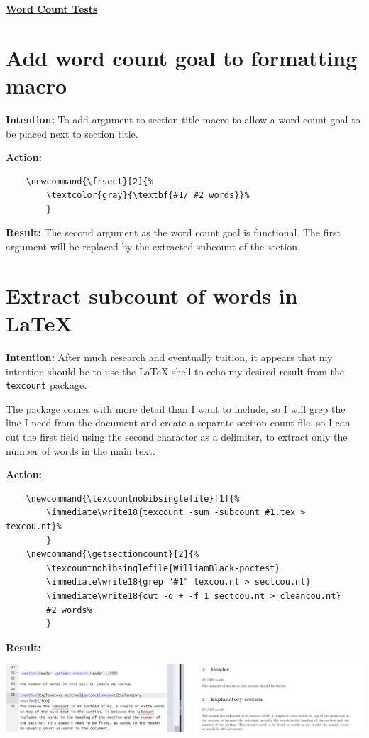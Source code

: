 \documentclass[12pt]{article}
\begin{document}
\newpage

\underline{\textbf{\Large{Word Count Tests}}}
\section{\large Add word count goal to formatting macro}

\textbf{Intention:} To add argument to section title macro to allow a word count goal to be placed next to section title.

\textbf{Action:} \begin{verbatim}
    \newcommand{\frsect}[2]{%
        \textcolor{gray}{\textbf{#1/ #2 words}}%
        }
\end{verbatim}

\textbf{Result:} The second argument as the word count goal is functional. The first argument will be replaced by the extracted subcount of the section.

\section{\large Extract subcount of words in LaTeX}

\textbf{Intention:} After much research and eventually tuition, it appears that my intention should be to use the LaTeX shell to echo my desired result from the \texttt{texcount} package.

The package comes with more detail than I want to include, so I will grep the line I need from the document and create a separate section count file, so I can cut the first field using the second character as a delimiter, to extract only the number of words in the main text.

\textbf{Action:} 

\begin{verbatim}
    \newcommand{\texcountnobibsinglefile}[1]{%
        \immediate\write18{texcount -sum -subcount #1.tex > texcou.nt}%
        }
    \newcommand{\getsectioncount}[2]{%
        \texcountnobibsinglefile{WilliamBlack-poctest}
        \immediate\write18{grep "#1" texcou.nt > sectcou.nt}
        \immediate\write18{cut -d + -f 1 sectcou.nt > cleancou.nt}
        #2 words%
        }
\end{verbatim}

\textbf{Result:}

\includegraphics[width=\textwidth]{imgelaborationsubcountworks.PNG}
\end{document}
